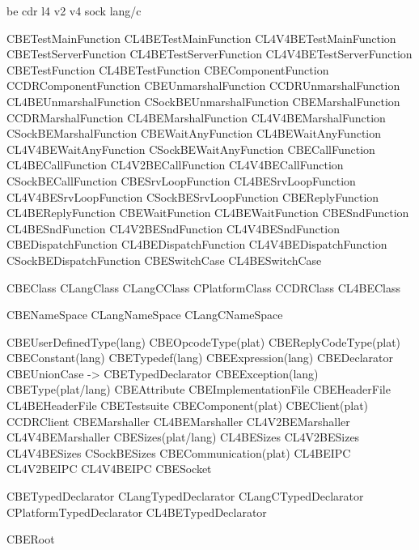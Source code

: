 be                        cdr                        l4                        v2                    v4                        sock                    lang/c

CBETestMainFunction                                  CL4BETestMainFunction                           CL4V4BETestMainFunction
CBETestServerFunction                                CL4BETestServerFunction                         CL4V4BETestServerFunction
CBETestFunction                                      CL4BETestFunction
CBEComponentFunction      CCDRComponentFunction
CBEUnmarshalFunction      CCDRUnmarshalFunction      CL4BEUnmarshalFunction                                                    CSockBEUnmarshalFunction
CBEMarshalFunction        CCDRMarshalFunction        CL4BEMarshalFunction                            CL4V4BEMarshalFunction    CSockBEMarshalFunction
CBEWaitAnyFunction                                   CL4BEWaitAnyFunction                            CL4V4BEWaitAnyFunction    CSockBEWaitAnyFunction
CBECallFunction                                      CL4BECallFunction         CL4V2BECallFunction   CL4V4BECallFunction       CSockBECallFunction
CBESrvLoopFunction                                   CL4BESrvLoopFunction                            CL4V4BESrvLoopFunction    CSockBESrvLoopFunction
CBEReplyFunction                                     CL4BEReplyFunction
CBEWaitFunction                                      CL4BEWaitFunction
CBESndFunction                                       CL4BESndFunction          CL4V2BESndFunction    CL4V4BESndFunction
CBEDispatchFunction                                  CL4BEDispatchFunction                           CL4V4BEDispatchFunction   CSockBEDispatchFunction
CBESwitchCase                                        CL4BESwitchCase

CBEClass
CLangClass                                                                                                                                             CLangCClass
CPlatformClass            CCDRClass                  CL4BEClass

CBENameSpace
CLangNameSpace                                                                                                                                         CLangCNameSpace

CBEUserDefinedType(lang)
CBEOpcodeType(plat)
CBEReplyCodeType(plat)
CBEConstant(lang)
CBETypedef(lang)
CBEExpression(lang)
CBEDeclarator
CBEUnionCase -> CBETypedDeclarator
CBEException(lang)
CBEType(plat/lang)
CBEAttribute
CBEImplementationFile
CBEHeaderFile                                        CL4BEHeaderFile
CBETestsuite
CBEComponent(plat)
CBEClient(plat)            CCDRClient
CBEMarshaller                                        CL4BEMarshaller           CL4V2BEMarshaller     CL4V4BEMarshaller
CBESizes(plat/lang)                                  CL4BESizes                CL4V2BESizes          CL4V4BESizes              CSockBESizes
CBECommunication(plat)                               CL4BEIPC                  CL4V2BEIPC            CL4V4BEIPC                CBESocket

CBETypedDeclarator
CLangTypedDeclarator                                                                                                                                   CLangCTypedDeclarator
CPlatformTypedDeclarator                             CL4BETypedDeclarator

CBERoot
